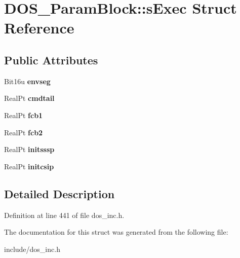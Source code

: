 \hypertarget{structDOS__ParamBlock_1_1sExec}{\section{D\-O\-S\-\_\-\-Param\-Block\-:\-:s\-Exec Struct Reference}
\label{structDOS__ParamBlock_1_1sExec}
}
\subsection*{Public Attributes}
\begin{DoxyCompactItemize}
\item 
\hypertarget{structDOS__ParamBlock_1_1sExec_ab687ac3ee3f86582a88216f428b86770}{Bit16u {\bfseries envseg}}\label{structDOS__ParamBlock_1_1sExec_ab687ac3ee3f86582a88216f428b86770}

\item 
\hypertarget{structDOS__ParamBlock_1_1sExec_ab6b6951382774b8c938f9428192c529d}{Real\-Pt {\bfseries cmdtail}}\label{structDOS__ParamBlock_1_1sExec_ab6b6951382774b8c938f9428192c529d}

\item 
\hypertarget{structDOS__ParamBlock_1_1sExec_a90a2f5095e246afb9c22e59625d47637}{Real\-Pt {\bfseries fcb1}}\label{structDOS__ParamBlock_1_1sExec_a90a2f5095e246afb9c22e59625d47637}

\item 
\hypertarget{structDOS__ParamBlock_1_1sExec_a07ee173102f3e88504b4c76674174243}{Real\-Pt {\bfseries fcb2}}\label{structDOS__ParamBlock_1_1sExec_a07ee173102f3e88504b4c76674174243}

\item 
\hypertarget{structDOS__ParamBlock_1_1sExec_a0541b0ed955144e206155d01815ab077}{Real\-Pt {\bfseries initsssp}}\label{structDOS__ParamBlock_1_1sExec_a0541b0ed955144e206155d01815ab077}

\item 
\hypertarget{structDOS__ParamBlock_1_1sExec_a9fd385a207f3887bc6e26973d2b11e8f}{Real\-Pt {\bfseries initcsip}}\label{structDOS__ParamBlock_1_1sExec_a9fd385a207f3887bc6e26973d2b11e8f}

\end{DoxyCompactItemize}


\subsection{Detailed Description}


Definition at line 441 of file dos\-\_\-inc.\-h.



The documentation for this struct was generated from the following file\-:\begin{DoxyCompactItemize}
\item 
include/dos\-\_\-inc.\-h\end{DoxyCompactItemize}
